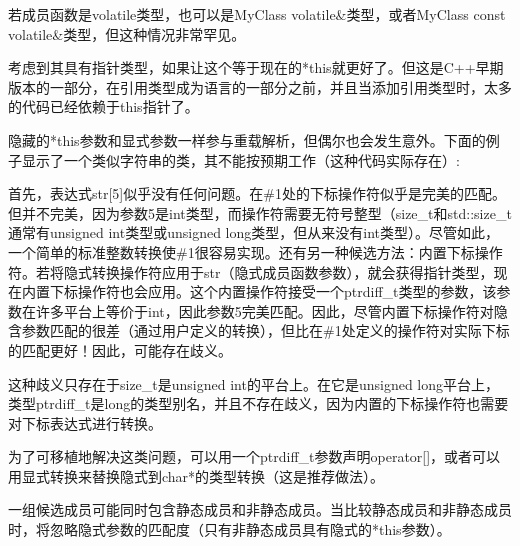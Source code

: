 \begin{notice}
若成员函数是volatile类型，也可以是MyClass volatile\&类型，或者MyClass const volatile\&类型，但这种情况非常罕见。
\end{notice}

考虑到其具有指针类型，如果让这个等于现在的*this就更好了。但这是C++早期版本的一部分，在引用类型成为语言的一部分之前，并且当添加引用类型时，太多的代码已经依赖于this指针了。

隐藏的*this参数和显式参数一样参与重载解析，但偶尔也会发生意外。下面的例子显示了一个类似字符串的类，其不能按预期工作（这种代码实际存在）:


首先，表达式str[5]似乎没有任何问题。在\#1处的下标操作符似乎是完美的匹配。但并不完美，因为参数5是int类型，而操作符需要无符号整型（size\_t和std::size\_t通常有unsigned int类型或unsigned long类型，但从来没有int类型）。尽管如此，一个简单的标准整数转换使\#1很容易实现。还有另一种候选方法：内置下标操作符。若将隐式转换操作符应用于str（隐式成员函数参数），就会获得指针类型，现在内置下标操作符也会应用。这个内置操作符接受一个ptrdiff\_t类型的参数，该参数在许多平台上等价于int，因此参数5完美匹配。因此，尽管内置下标操作符对隐含参数匹配的很差（通过用户定义的转换），但比在\#1处定义的操作符对实际下标的匹配更好！因此，可能存在歧义。

\begin{notice}
这种歧义只存在于size\_t是unsigned int的平台上。在它是unsigned long平台上，类型ptrdiff\_t是long的类型别名，并且不存在歧义，因为内置的下标操作符也需要对下标表达式进行转换。
\end{notice}

为了可移植地解决这类问题，可以用一个ptrdiff\_t参数声明operator[]，或者可以用显式转换来替换隐式到char*的类型转换（这是推荐做法）。

一组候选成员可能同时包含静态成员和非静态成员。当比较静态成员和非静态成员时，将忽略隐式参数的匹配度（只有非静态成员具有隐式的*this参数）。

